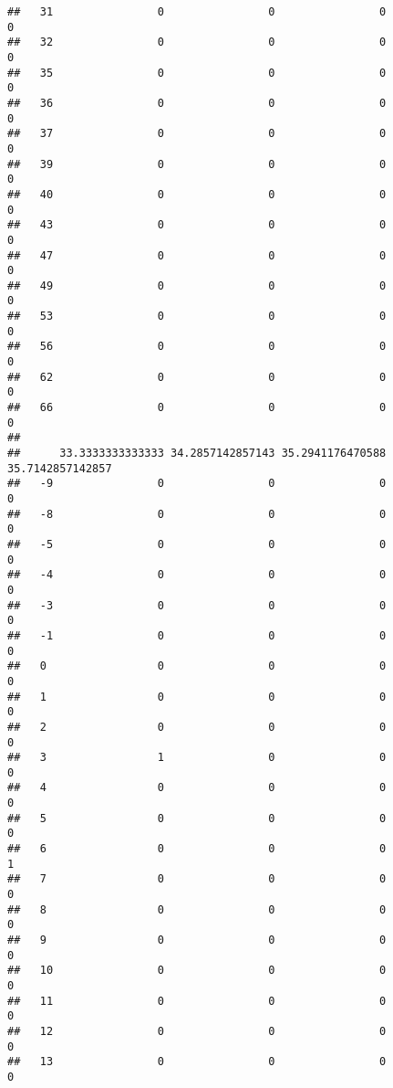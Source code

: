 \documentclass[]{article}
\begin{document}
\begin{verbatim}
##   31                0                0                0                0
##   32                0                0                0                0
##   35                0                0                0                0
##   36                0                0                0                0
##   37                0                0                0                0
##   39                0                0                0                0
##   40                0                0                0                0
##   43                0                0                0                0
##   47                0                0                0                0
##   49                0                0                0                0
##   53                0                0                0                0
##   56                0                0                0                0
##   62                0                0                0                0
##   66                0                0                0                0
##     
##      33.3333333333333 34.2857142857143 35.2941176470588 35.7142857142857
##   -9                0                0                0                0
##   -8                0                0                0                0
##   -5                0                0                0                0
##   -4                0                0                0                0
##   -3                0                0                0                0
##   -1                0                0                0                0
##   0                 0                0                0                0
##   1                 0                0                0                0
##   2                 0                0                0                0
##   3                 1                0                0                0
##   4                 0                0                0                0
##   5                 0                0                0                0
##   6                 0                0                0                1
##   7                 0                0                0                0
##   8                 0                0                0                0
##   9                 0                0                0                0
##   10                0                0                0                0
##   11                0                0                0                0
##   12                0                0                0                0
##   13                0                0                0                0

\end{verbatim}
\end{document}

